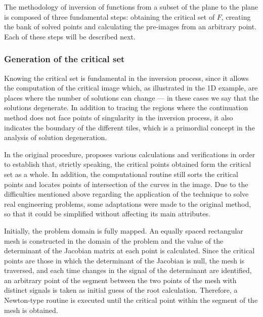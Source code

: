\documentclass[journal=iecred,manuscript=article]{achemso}
\theoremstyle{definition}
\theoremstyle{remark}
\begin{document}


The methodology of inversion of functions from
a subset of the plane to the plane is composed of three 
fundamental steps: obtaining the critical set of $ F $, 
creating the bank of solved points and calculating the pre-images from an arbitrary point. Each of these steps will be described next.

\subsubsection{Generation of the critical set}

Knowing the critical set is fundamental in the inversion process, since it 
allows the computation of the critical image which, as
illustrated in the 1D example, are places where the number
of solutions can change --- in these cases  we say that the 
solutions
degenerate.
 In addition to tracing the regions where the continuation method does not face points of singularity in the inversion process, it also indicates the boundary
 of the  different tiles, which is a primordial concept in the analysis of solution degeneration. 

In the original procedure, \citet{malta} proposes various calculations and verifications in order to establish that, strictly speaking, the critical points obtained form the critical set as a whole. In addition, the computational routine still sorts the critical points and locates points of intersection of the curves in the image. Due to the difficulties mentioned above regarding the application of the technique to solve real engineering problems, some adaptations were made to the original method, so that it could be simplified without affecting its main attributes.

Initially, the problem domain is fully mapped. An equally spaced rectangular mesh is constructed in the domain of the problem and the value of the determinant of the Jacobian matrix at each point is calculated. Since the critical points are those in which the determinant of the Jacobian is null, the mesh is traversed, and each time changes 
  in the signal of the determinant are identified,
   an arbitrary point of the segment between the two points 
   of the mesh with distinct signals is taken as initial guess of the root calculation.
    Therefore, a Newton-type routine is executed until the critical point within the segment of the mesh
     is obtained.
\end{document}
